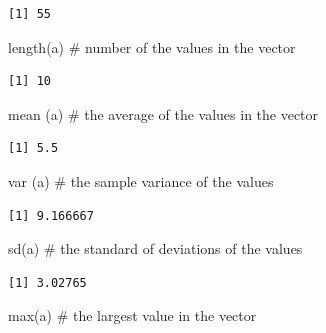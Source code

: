\documentclass[
  letterpaper,
  DIV=11,
  numbers=noendperiod]{scrreprt}
\newenvironment{Shaded}{\begin{snugshade}}{\end{snugshade}}
\newcommand{\CommentTok}[1]{\textcolor[rgb]{0.37,0.37,0.37}{#1}}
\newcommand{\FunctionTok}[1]{\textcolor[rgb]{0.28,0.35,0.67}{#1}}
\newcommand{\NormalTok}[1]{\textcolor[rgb]{0.00,0.23,0.31}{#1}}
\begin{document}
\begin{verbatim}
[1] 55
\end{verbatim}

\begin{Shaded}
\begin{Highlighting}[]
\FunctionTok{length}\NormalTok{(a)     }\CommentTok{\# number of the values in the vector }
\end{Highlighting}
\end{Shaded}

\begin{verbatim}
[1] 10
\end{verbatim}

\begin{Shaded}
\begin{Highlighting}[]
\FunctionTok{mean}\NormalTok{ (a)      }\CommentTok{\# the average of the values in the vector }
\end{Highlighting}
\end{Shaded}

\begin{verbatim}
[1] 5.5
\end{verbatim}

\begin{Shaded}
\begin{Highlighting}[]
\FunctionTok{var}\NormalTok{ (a)        }\CommentTok{\# the sample variance of the values }
\end{Highlighting}
\end{Shaded}

\begin{verbatim}
[1] 9.166667
\end{verbatim}

\begin{Shaded}
\begin{Highlighting}[]
\FunctionTok{sd}\NormalTok{(a)         }\CommentTok{\# the standard of deviations of the values  }
\end{Highlighting}
\end{Shaded}

\begin{verbatim}
[1] 3.02765
\end{verbatim}

\begin{Shaded}
\begin{Highlighting}[]
\FunctionTok{max}\NormalTok{(a)        }\CommentTok{\# the largest value in the vector  }
\end{Highlighting}
\end{Shaded}
\end{document}
